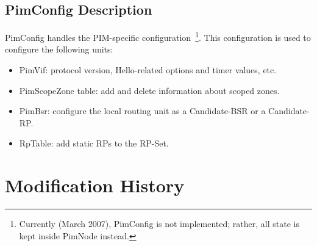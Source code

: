 \documentclass[11pt]{article}
\begin{document}
\subsection{PimConfig Description}

PimConfig handles the PIM-specific configuration~\footnote{Currently
(March 2007), PimConfig is not implemented; rather, all state is
kept inside PimNode instead.}. This configuration is used to configure the
following units:

\begin{itemize}

  \item PimVif: protocol version, Hello-related options and timer
  values, etc.

  \item PimScopeZone table: add and delete information about scoped zones.

  \item PimBsr: configure the local routing unit as a Candidate-BSR or a
  Candidate-RP.

  \item RpTable: add static RPs to the RP-Set.

\end{itemize}

\appendix
\section{Modification History}
\end{document}
